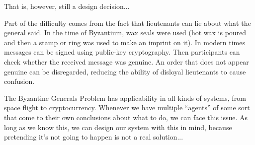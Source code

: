 That is, however, still a design decision...

Part of the difficulty comes from the fact that lieutenants can lie about what the general said.  In the time of Byzantium, wax seals were used (hot wax is poured and then a stamp or ring was used to make an imprint on it). In modern times messages can be signed using public-key cryptography. Then participants can check whether the received message was genuine. An order that does not appear genuine can be disregarded, reducing the ability of disloyal lieutenants to cause confusion.

The Byzantine Generals Problem has applicability in all kinds of systems, from space flight to cryptocurrency. Whenever we have multiple ``agents'' of some sort that come to their own conclusions about what to do, we can face this issue. As long as we know this, we can design our system with this in mind, because pretending it's not going to happen is not a real solution...



